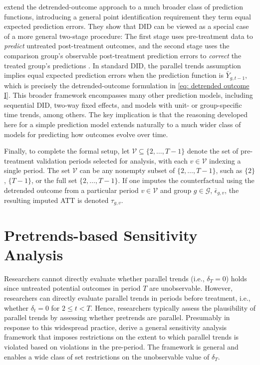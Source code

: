 \documentclass[twoside,11pt]{article}
\begin{document}
\citet{leavitthatfield2025} extend the detrended-outcome approach to a much broader class of prediction functions, introducing a general point identification requirement they term equal expected prediction errors. They show that DID can be viewed as a special case of a more general two-stage procedure: The first stage uses pre-treatment data to \textit{predict} untreated post-treatment outcomes, and the second stage uses the comparison group's observable post-treatment prediction errors to \textit{correct} the treated group's predictions \citep[see][p.~1827]{leavitthatfield2025}. In standard DID, the parallel trends assumption implies equal expected prediction errors when the prediction function is $\bar{Y}_{g,t-1}$, which is precisely the detrended-outcome formulation in \eqref{eq: detrended outcome I}. This broader framework encompasses many other prediction models, including sequential DID, two-way fixed effects, and models with unit- or group-specific time trends, among others. The key implication is that the reasoning developed here for a simple prediction model extends naturally to a much wider class of models for predicting how outcomes evolve over time.

Finally, to complete the formal setup, let $\mathcal{V} \subseteq \{2, \ldots, T - 1\}$ denote the set of pre-treatment validation periods selected for analysis, with each $v \in \mathcal{V}$ indexing a single period. The set $\mathcal{V}$ can be any nonempty subset of $\{2, \ldots, T - 1\}$,  such as $\{2\}$, $\{T - 1\}$, or the full set $\{2, \ldots, T - 1\}$. If one imputes the counterfactual using the detrended outcome from a particular period $v \in \mathcal{V}$ and group $g \in \mathcal{G}$, $\bar{\epsilon}_{g,v}$, the resulting imputed \textrm{ATT} is denoted $\tau_{g,v}$.

\section{Pretrends-based Sensitivity Analysis} \label{sec: pretrends model}

Researchers cannot directly evaluate whether parallel trends (i.e., $\delta_T = 0$) holds since untreated potential outcomes in period $T$ are unobservable. However, researchers can directly evaluate parallel trends in periods before treatment, i.e., whether $\delta_t = 0$ for $2 \leq t < T$. Hence, researchers typically assess the plausibility of parallel trends by assessing whether pretrends are parallel. Presumably in response to this widespread practice, \citet{rambachanroth2023} derive a general sensitivity analysis framework that imposes restrictions on the extent to which parallel trends is violated based on violations in the pre-period. The framework is general and enables  a wide class of set restrictions on the unobservable value of $\delta_T$.
\end{document}
